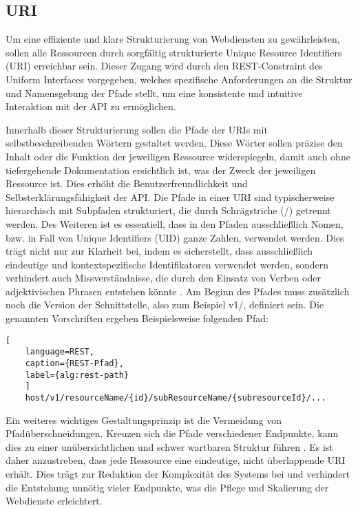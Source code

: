 \documentclass[draft,final]{vutinfth} %
\begin{document}
\subsection{URI}

Um eine effiziente und klare Strukturierung von Webdiensten zu gewährleisten, sollen alle Ressourcen durch sorgfältig strukturierte Unique Resource Identifiers (URI) erreichbar sein.
Dieser Zugang wird durch den REST-Constraint des Uniform Interfaces vorgegeben, welches spezifische Anforderungen an die Struktur und Namensgebung der Pfade stellt, um eine konsistente und intuitive Interaktion mit der API zu ermöglichen.

Innerhalb dieser Strukturierung sollen die Pfade der URIs mit selbstbeschreibenden Wörtern gestaltet werden. 
Diese Wörter sollen präzise den Inhalt oder die Funktion der jeweiligen Ressource widerspiegeln, damit auch ohne tiefergehende Dokumentation ersichtlich ist, was der Zweck der jeweiligen Ressource ist. 
Dies erhöht die Benutzerfreundlichkeit und Selbsterklärungsfähigkeit der API.
Die Pfade in einer URI sind typischerweise hierarchisch mit Subpfaden strukturiert, die durch Schrägstriche (\grqq /\grqq ) getrennt werden.
Des Weiteren ist es essentiell, dass in den Pfaden ausschließlich Nomen, bzw. in Fall von Unique Identifiers (UID) ganze Zahlen, verwendet werden. 
Dies trägt nicht nur zur Klarheit bei, indem es sicherstellt, dass ausschließlich eindeutige und kontextspezifische Identifikatoren verwendet werden, sondern verhindert auch Missverständnisse, die durch den Einsatz von Verben oder adjektivischen Phrasen entstehen könnte \cite{Archip:2018:RestStandards}.
Am Beginn des Pfades muss zusätzlich noch die Version der Schnittstelle, also zum Beispiel \grqq v1/\grqq , definiert sein. 
Die genannten Vorschriften ergeben Beispielsweise folgenden Pfad:

\begin{lstlisting}[
	language=REST, 
	caption={REST-Pfad}, 
	label={alg:rest-path}
	]
	host/v1/resourceName/{id}/subResourceName/{subresourceId}/...
\end{lstlisting}

Ein weiteres wichtiges Gestaltungsprinzip ist die Vermeidung von Pfadüberschneidungen. 
Kreuzen sich die Pfade verschiedener Endpunkte, kann dies zu einer unübersichtlichen und schwer wartbaren Struktur führen \cite{Archip:2018:RestStandards}. 
Es ist daher anzustreben, dass jede Ressource eine eindeutige, nicht überlappende URI erhält. 
Dies trägt zur Reduktion der Komplexität des Systems bei und verhindert die Entstehung unnötig vieler Endpunkte, was die Pflege und Skalierung der Webdienste erleichtert.
\end{document}

